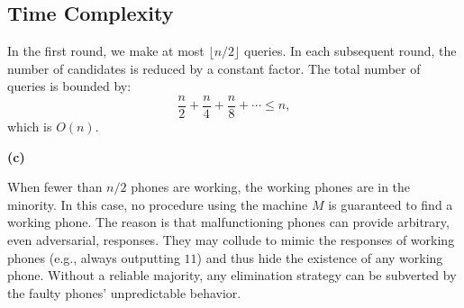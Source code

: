 \documentclass[11pt]{article}
\begin{document}
    \subsection*{Time Complexity}
    In the first round, we make at most $\lfloor n/2 \rfloor$ queries. In each subsequent round, the number of candidates is reduced by a constant factor. The total number of queries is bounded by:
    \[
    \frac{n}{2} + \frac{n}{4} + \frac{n}{8} + \cdots \leq n,
    \]
    which is $O(n)$.
    
    \bigskip

    \textbf{(c) }

    When fewer than \(n/2\) phones are working, the working phones are in the minority. In this case, no procedure using the machine \(M\) is guaranteed to find a working phone. The reason is that malfunctioning phones can provide arbitrary, even adversarial, responses. They may collude to mimic the responses of working phones (e.g., always outputting \(11\)) and thus hide the existence of any working phone. Without a reliable majority, any elimination strategy can be subverted by the faulty phones’ unpredictable behavior.
    
\end{document}
